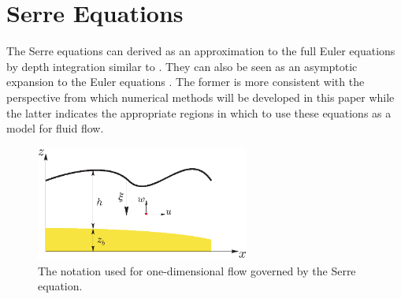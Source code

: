 \documentclass[SingleSpace,12pt]{Serre_ASCE}
\begin{document}
\section{Serre Equations}
\label{section:Serre Equations}
The Serre equations can derived as an approximation to the full Euler equations by depth integration similar to . They can also be seen as an asymptotic expansion to the Euler equations \cite{Bonneton-Lannes-2009-16601}. The former is more consistent with the perspective from which numerical methods will be developed in this paper while the latter indicates the appropriate regions in which to use these equations as a model for fluid flow.
\begin{figure}[htb]
\begin{center}
\includegraphics[width=7.0cm]{one-dimensional-axis_Serre.eps}
\end{center}
\caption{The notation used for one-dimensional flow governed by the Serre equation.}
\label{fig:Notation}
\end{figure}
\end{document}
